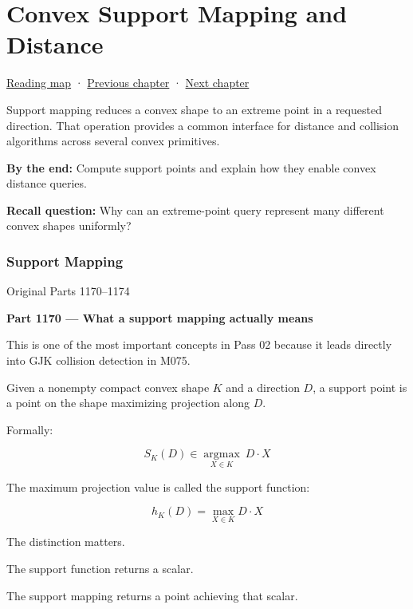 \chapter{Convex Support Mapping and Distance}\label{04-visual-computing-ii-ch022-convex-support-mapping-and-distance}\hypertarget{04-visual-computing-ii-ch022}{}\label{stagechapter:04-visual-computing-ii-ch022}

\hyperref[volume-reading-map]{Reading map} · \hyperref[03-visual-computing-i-ch021-collision-implementations-and-repository-comparison]{Previous chapter} · \hyperref[04-visual-computing-ii-ch023-mesh-topology-and-connectivity]{Next chapter}

Support mapping reduces a convex shape to an extreme point in a requested direction. That operation provides a common interface for distance and collision algorithms across several convex primitives.

\textbf{By the end:} Compute support points and explain how they enable convex distance queries.

\textbf{Recall question:} Why can an extreme-point query represent many different convex shapes uniformly?

\subsection{Support Mapping}\label{04-visual-computing-ii-ch022-support-mapping}

Original Parts 1170--1174

\textbf{Part 1170 --- What a support mapping actually means}

This is one of the most important concepts in Pass 02 because it leads directly into GJK collision detection in M075.

Given a nonempty compact convex shape \(K\) and a direction \(D\), a support point is a point on the shape maximizing projection along \(D\).

Formally:

\[
\boxed{ S_K(D)\in \underset{X\in K}{\operatorname{argmax}} \ D\cdot X }
\]

The maximum projection value is called the support function:

\[
\boxed{ h_K(D)=\max_{X\in K}D\cdot X }
\]

The distinction matters.

The support function returns a scalar.

The support mapping returns a point achieving that scalar.

